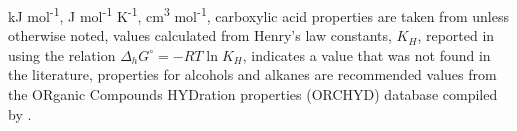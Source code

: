 {\begin{table}
\begin{adjustbox}{width=0.7\linewidth,keepaspectratio}
\begin{threeparttable}
  
  \begin{tablenotes}
     kJ mol\textsuperscript{-1},
     J mol\textsuperscript{-1} K\textsuperscript{-1},
     cm\textsuperscript{3} mol\textsuperscript{-1},
     carboxylic acid properties are taken from \cite{shock1995organic} unless otherwise noted,
     values calculated from Henry's law constants, $K_{H}$, reported in \cite{khan1992henry} using the relation $\Delta_{h}G^{\circ} = -RT\ln{K_{H}}$,
     indicates a value that was not found in the literature,
     properties for alcohols and alkanes are recommended values from the ORganic Compounds HYDration properties (ORCHYD) database compiled by \cite{plyasunova2004database}.
    \item
        
  \end{tablenotes}
  
  \label{tab:carbacid_alc_alk_props}
  \end{threeparttable}
  \end{adjustbox}
\end{table}
\setcounter{tabcounter}{0} %
\doublespace
\clearpage
}


